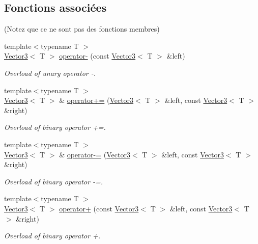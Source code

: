 \subsection*{Fonctions associées}
(Notez que ce ne sont pas des fonctions membres) \begin{DoxyCompactItemize}
\item 
{\footnotesize template$<$typename T $>$ }\\\hyperlink{classsf_1_1Vector3}{Vector3}$<$ T $>$ \hyperlink{classsf_1_1Vector3_a9b75d2fb9b0f2fd9fe33f8f06f9dda75}{operator-\/} (const \hyperlink{classsf_1_1Vector3}{Vector3}$<$ T $>$ \&left)
\begin{DoxyCompactList}\small\item\em Overload of unary operator -\/. \end{DoxyCompactList}\item 
{\footnotesize template$<$typename T $>$ }\\\hyperlink{classsf_1_1Vector3}{Vector3}$<$ T $>$ \& \hyperlink{classsf_1_1Vector3_abc28859af163c63318ea2723b81c5ad9}{operator+=} (\hyperlink{classsf_1_1Vector3}{Vector3}$<$ T $>$ \&left, const \hyperlink{classsf_1_1Vector3}{Vector3}$<$ T $>$ \&right)
\begin{DoxyCompactList}\small\item\em Overload of binary operator +=. \end{DoxyCompactList}\item 
{\footnotesize template$<$typename T $>$ }\\\hyperlink{classsf_1_1Vector3}{Vector3}$<$ T $>$ \& \hyperlink{classsf_1_1Vector3_aa465672d2a4ee5fd354e585cf08d2ab9}{operator-\/=} (\hyperlink{classsf_1_1Vector3}{Vector3}$<$ T $>$ \&left, const \hyperlink{classsf_1_1Vector3}{Vector3}$<$ T $>$ \&right)
\begin{DoxyCompactList}\small\item\em Overload of binary operator -\/=. \end{DoxyCompactList}\item 
{\footnotesize template$<$typename T $>$ }\\\hyperlink{classsf_1_1Vector3}{Vector3}$<$ T $>$ \hyperlink{classsf_1_1Vector3_a6500a0cb00e07801e9e9d7e96852ddd3}{operator+} (const \hyperlink{classsf_1_1Vector3}{Vector3}$<$ T $>$ \&left, const \hyperlink{classsf_1_1Vector3}{Vector3}$<$ T $>$ \&right)
\begin{DoxyCompactList}\small\item\em Overload of binary operator +. \end{DoxyCompactList}\item 

\end{DoxyCompactItemize}

